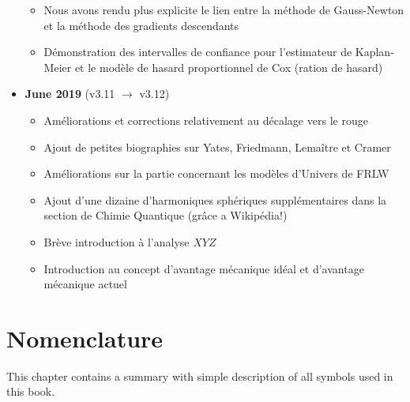 \documentclass[12pt,a4paper,twoside,openright]{report}
\theoremstyle{definition}
\theoremstyle{itexmp}
\numberwithin{equation}{section}
\begin{document}
\begin{itemize}
\begin{itemize}[noitemsep]
				\item Nous avons rendu plus explicite le lien entre la méthode de Gauss-Newton et la méthode des gradients descendants
				\item Démonstration des intervalles de confiance pour l'estimateur de Kaplan-Meier et le modèle de hasard proportionnel de Cox (ration de hasard)
		\end{itemize}
		\item \textbf{June 2019} (v3.11 $\rightarrow$ v3.12)
			\begin{itemize}[noitemsep]
				\item Améliorations et corrections relativement au décalage vers le rouge
				\item Ajout de petites biographies sur Yates, Friedmann, Lemaître et Cramer
				\item Améliorations sur la partie concernant les modèles d'Univers de FRLW
				\item Ajout d'une dizaine d'harmoniques sphériques supplémentaires dans la section de Chimie Quantique (grâce a Wikipédia!)
				\item Brève introduction à l'analyse $XYZ$
				\item Introduction au concept d'avantage mécanique idéal et d'avantage mécanique actuel
		\end{itemize}
	\end{itemize}

\chapter{Nomenclature}

This chapter contains a summary with simple description of all symbols used in this book.
\end{document}
